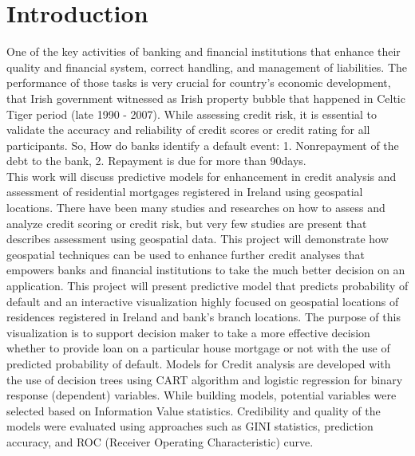 %
%
%
%

\chapter{Introduction}\label{C.intro}
One of the key activities of banking and financial institutions that enhance their quality and financial system, correct handling, and management of liabilities. The performance of those tasks is very crucial for country's economic development, that Irish government witnessed as Irish property bubble that happened in Celtic Tiger period (late 1990 - 2007). While assessing credit risk, it is essential to validate the accuracy and reliability of credit scores or credit rating for all participants. So, How do banks identify a default event: 1. Nonrepayment of the debt to the bank, 2. Repayment is due for more than 90days.\\

This work will discuss predictive models for enhancement in credit analysis and assessment of residential mortgages registered in Ireland using geospatial locations. There have been many studies and researches on how to assess and analyze credit scoring or credit risk, but very few studies are present that describes assessment using geospatial data. This project will demonstrate how geospatial techniques can be used to enhance further credit analyses that empowers banks and financial institutions to take the much better decision on an application. This project will present predictive model that predicts probability of default and an interactive visualization highly focused on geospatial locations of residences registered in Ireland and bank's branch locations. The purpose of this visualization is to support decision maker to take a more effective decision whether to provide loan on a particular house mortgage or not with the use of predicted probability of default. Models for Credit analysis are developed with the use of decision trees using CART algorithm and logistic regression for binary response (dependent) variables. While building models, potential variables were selected based on Information Value statistics. Credibility and quality of the models were evaluated using approaches such as GINI statistics, prediction accuracy, and ROC (Receiver Operating Characteristic) curve.\\

